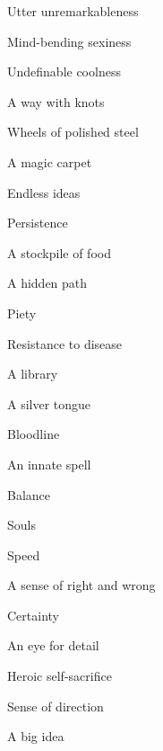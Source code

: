  
\item Utter unremarkableness

 
\item Mind-bending sexiness

 
\item Undefinable coolness

 
\item A way with knots

 
\item Wheels of polished steel

 
\item A magic carpet

 
\item Endless ideas

 
\item Persistence

 
\item A stockpile of food

 
\item A hidden path

 
\item Piety

 
\item Resistance to disease

 
\item A library

 
\item A silver tongue

 
\item Bloodline

 
\item An innate spell

 
\item Balance

 
\item Souls

 
\item Speed

 
\item A sense of right and wrong

 
\item Certainty

 
\item An eye for detail

 
\item Heroic self-sacrifice

 
\item Sense of direction

 
\item A big idea

